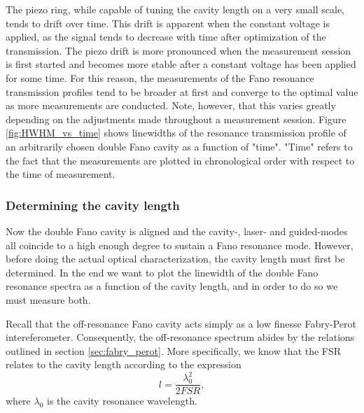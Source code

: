 The piezo ring, while capable of tuning the cavity length on a very small scale, tends to drift over time. This drift is apparent when the constant voltage is applied, as the signal tends to decrease with time after optimization of the transmission. The piezo drift is more pronounced when the measurement session is first started and becomes more stable after a constant voltage has been applied for some time. For this reason, the measurements of the Fano resonance transmission profiles tend to be broader at first and converge to the optimal value as more measurements are conducted. Note, however, that this varies greatly depending on the adjustments made throughout a measurement session. Figure \ref{fig:HWHM_vs_time} shows linewidths of the resonance transmission profile of an arbitrarily chosen double Fano cavity as a function of "time". "Time" refers to the fact that the measurements are plotted in chronological order with respect to the time of measurement. 

\subsubsection{Determining the cavity length}

Now the double Fano cavity is aligned and the cavity-, laser- and guided-modes all coincide to a high enough degree to sustain a Fano resonance mode. However, before doing the actual optical characterization, the cavity length must first be determined. In the end we want to plot the linewidth of the double Fano resonance spectra as a function of the cavity length, and in order to do so we must measure both. 

Recall that the off-resonance Fano cavity acts simply as a low finesse Fabry-Perot intereferometer. Consequently, the off-resonance spectrum abides by the relations outlined in section \ref{sec:fabry_perot}. More specifically, we know that the FSR relates to the cavity length according to the expression
\begin{equation}
    l = \frac{\lambda_0^2}{2 FSR},
    \label{eq:cavity_length_from_fsr}
\end{equation}
where $\lambda_0$ is the cavity resonance wavelength. 

